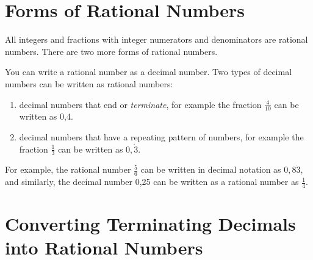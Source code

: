 \documentclass[10pt,a4paper,titlepage,twoside,openright]{report}
\begin{document}
\section{Forms of Rational Numbers}
All integers and fractions with integer numerators and denominators are rational numbers. There are two more forms of rational numbers.


You can write a rational number as a decimal number. Two types of decimal numbers can be written as rational numbers:
\begin{enumerate}
\item{decimal numbers that end or \textit{terminate}, for example the fraction $\frac{4}{10}$ can be written as 0,4.}
\item{decimal numbers that have a repeating pattern of numbers, for example the fraction $\frac{1}{3}$ can be written as $0,\dot{3}$.}
\end{enumerate}

For example, the rational number $\frac{5}{6}$ can be written in decimal notation as $0,8\dot{3}$, and similarly, the decimal number 0,25 can be written as a rational number as $\frac{1}{4}$.


\section{Converting Terminating Decimals into Rational Numbers}
\label{mn:r:dr}
\end{document}

